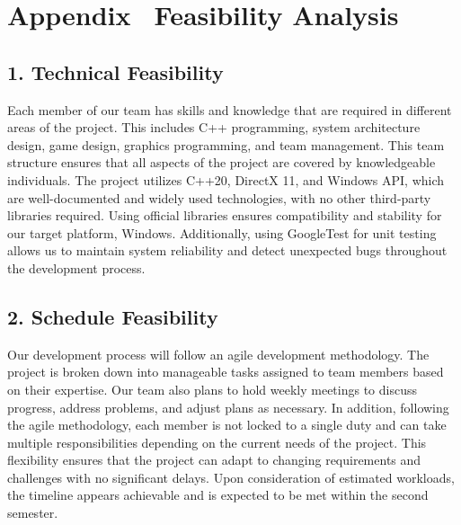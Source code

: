 \section*{Appendix \thesection \, \textbar \vspace{0.5em} Feasibility Analysis}
\label{sec:appendix-feasibility}
%

\subsection*{1. Technical Feasibility}
Each member of our team has skills and knowledge that are required in different areas of the project.
This includes C++ programming, system architecture design, game design, graphics programming, and team management.
This team structure ensures that all aspects of the project are covered by knowledgeable individuals.
The project utilizes C++20, DirectX 11, and Windows API, which are well-documented and widely used technologies, with no other third-party libraries required.
Using official libraries ensures compatibility and stability for our target platform, Windows.
Additionally, using GoogleTest for unit testing allows us to maintain system reliability and detect unexpected bugs throughout the development process.

\subsection*{2. Schedule Feasibility}
Our development process will follow an agile development methodology.
The project is broken down into manageable tasks assigned to team members based on their expertise.
Our team also plans to hold weekly meetings to discuss progress, address problems, and adjust plans as necessary.
In addition, following the agile methodology, each member is not locked to a single duty and can take multiple responsibilities depending on the current needs of the project.
This flexibility ensures that the project can adapt to changing requirements and challenges with no significant delays.
Upon consideration of estimated workloads, the timeline appears achievable and is expected to be met within the second semester.


